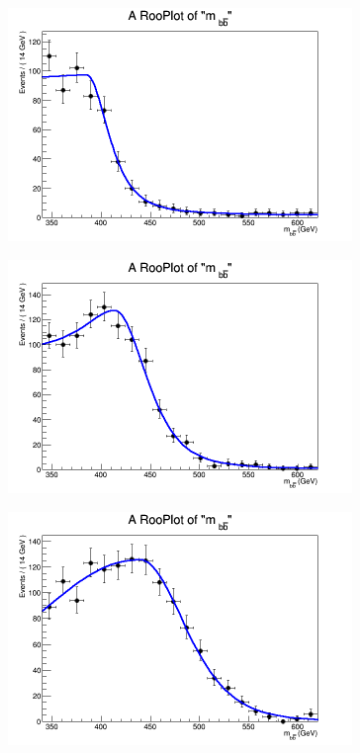 \begin{figure}[phtb!]
  \begin{center}
  \begin{subfigure}[$m_{A}=400$ GeV]{0.4\textwidth}\includegraphics[width=\textwidth]{FitResults/images/fitMC_bAbb400_5.png}\end{subfigure}
  \begin{subfigure}[$m_{A}=450$ GeV]{0.4\textwidth}\includegraphics[width=\textwidth]{FitResults/images/fitMC_bAbb450_5.png}\end{subfigure}
  \begin{subfigure}[$m_{A}=500$ GeV]{0.4\textwidth}\includegraphics[width=\textwidth]{FitResults/images/fitMC_bAbb500_5.png}\end{subfigure}

\end{center}
\end{figure}
